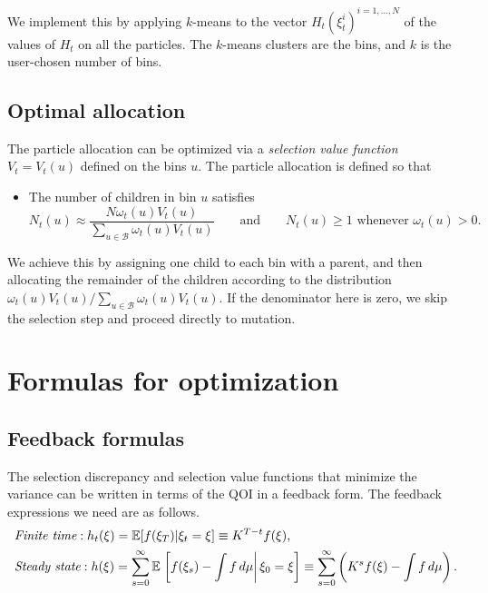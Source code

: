 \documentclass[11pt,letterpaper]{amsart}
\theoremstyle{plain}
\theoremstyle{definition}
\numberwithin{equation}{section}
\begin{document}
We implement this by applying $k$-means to the vector 
$H_t(\xi_t^i)^{i=1,\ldots,N}$ of the values of $H_t$ 
on all the particles. The $k$-means clusters are the bins, 
and $k$ is the user-chosen number of bins.

\subsection{Optimal allocation}

The particle allocation can be optimized 
via a {\em 
selection value function} $V_t = V_t(u)$ defined 
on the bins $u$. The particle 
allocation is defined so that 
\begin{itemize}
\item The number of children in bin $u$ satisfies
\begin{equation*}
N_t(u) \approx \frac{N\omega_t(u)V_t(u)}{\sum_{u \in {\mathcal B}}\omega_t(u)V_t(u)} \qquad \text{and}\qquad N_t(u) \ge 1\text{ whenever } \omega_t(u)>0.
\end{equation*}
\end{itemize}

We achieve this by assigning one child to 
each bin with a parent, and then allocating
the remainder of the children according to the 
distribution $\omega_t(u)V_t(u)/\sum_{u \in {\mathcal B}}\omega_t(u)V_t(u)$. If the denominator here is zero, we skip the selection step and proceed directly to mutation.



\section{Formulas for optimization}

\subsection{Feedback formulas}

The selection discrepancy and selection value 
functions that minimize the variance can 
be written in terms of the QOI in a   
feedback form. The feedback expressions we need are as follows.
\begin{align*}
&\textup{\em Finite time}: h_t(\xi) = {\mathbb E}[f(\xi_T)|\xi_t = \xi] \equiv K^{T-t}f(\xi),\\
&\textup{\em Steady state}: h(\xi) = \sum_{s=0}^\infty {\mathbb E}\left.\left[f(\xi_s)-\int f\,d\mu\right|\xi_0 = \xi\right] \equiv \sum_{s=0}^\infty \left(K^sf(\xi) - \int f\,d\mu\right).
\end{align*}
\end{document}
